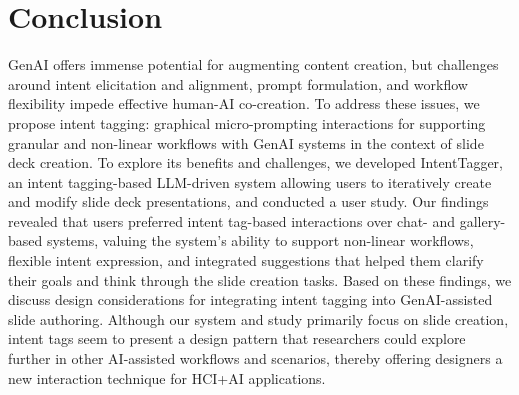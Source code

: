 \section{Conclusion}

GenAI offers immense potential for augmenting content creation, but challenges around intent elicitation and alignment, prompt formulation, and workflow flexibility impede effective human-AI co-creation. To address these issues, we propose intent tagging: graphical micro-prompting interactions for supporting granular and non-linear workflows with GenAI systems in the context of slide deck creation. To explore its benefits and challenges, we developed IntentTagger, an intent tagging-based LLM-driven system allowing users to iteratively create and modify slide deck presentations, and conducted a user study. Our findings revealed that users preferred intent tag-based interactions over chat- and gallery-based systems, valuing the system’s ability to support non-linear workflows, flexible intent expression, and integrated suggestions that helped them clarify their goals and think through the slide creation tasks. Based on these findings, we discuss design considerations for integrating intent tagging into GenAI-assisted slide authoring. Although our system and study primarily focus on slide creation, intent tags seem to present a design pattern that researchers could explore further in other AI-assisted workflows and scenarios, thereby offering designers a new interaction technique for HCI+AI applications. 

